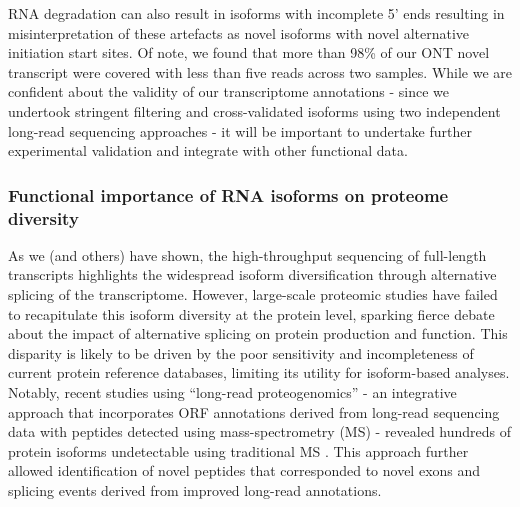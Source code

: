 RNA degradation can also result in isoforms with incomplete 5' ends resulting in misinterpretation of these artefacts as novel isoforms with novel alternative initiation start sites\cite{Kuo2020}. Of note, we found that more than 98\% of our ONT novel transcript were covered with less than five reads across two samples. While we are confident about the validity of our transcriptome annotations - since we undertook stringent filtering and cross-validated isoforms using two independent long-read sequencing approaches - it will be important to undertake further experimental validation and integrate with other functional data. 

\subsubsection{Functional importance of RNA isoforms on proteome diversity} 
\label{ch7: functional_importance}
As we (and others) have shown, the high-throughput sequencing of full-length transcripts highlights the widespread isoform diversification through alternative splicing of the transcriptome. However, large-scale proteomic studies have failed to recapitulate this isoform diversity at the protein level, sparking fierce debate about the impact of alternative splicing on protein production and function\cite{Tress2017a,Blencowe2017,Tress2017b}. This disparity is likely to be driven by the poor sensitivity and incompleteness of current protein reference databases, limiting its utility for isoform-based analyses\cite{Reixachs-Sole2022}. Notably, recent studies using “long-read proteogenomics” - an integrative approach that incorporates ORF annotations derived from long-read sequencing data with peptides detected using mass-spectrometry (MS) - revealed hundreds of protein isoforms undetectable using traditional MS \cite{Miller2022,Wang2019a}. This approach further allowed identification of novel peptides that corresponded to novel exons and splicing events derived from improved long-read annotations\cite{Miller2022,KayLeung2021}. 

